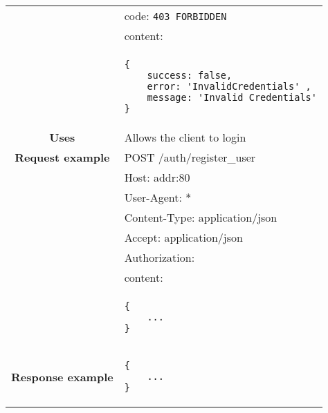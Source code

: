 \begin{adjustwidth}{1cm}{}
\begin{longtable}{|c|l|}
              & code: \texttt{403 FORBIDDEN} \\
            &                         content: \\
            & \begin{minipage}[t]{0.7\textwidth}
                \begin{adjustwidth}{1.5cm}{}
                \begin{verbatim}
{
    success: false, 
    error: 'InvalidCredentials' ,
    message: 'Invalid Credentials'
}
                \end{verbatim}
                \end{adjustwidth}
              \end{minipage} \\
              \hline
            \textbf{Uses} & Allows the client to login \\
            \hline
             \textbf{Request example}
             & POST /auth/register\_user \\
             & Host: addr:80\\
             & User-Agent: * \\
             & Content-Type: application/json\\
             & Accept: application/json\\
             & Authorization: \\
             & content: \\
            & \begin{minipage}[t]{0.5\textwidth}
                \begin{adjustwidth}{1.5cm}{}
                \begin{verbatim}
{
    ...
}
                \end{verbatim}
                \end{adjustwidth}
              \end{minipage} \\
              \hline
             \textbf{Response example} & 
              \begin{minipage}[t]{0.5\textwidth}
                \begin{adjustwidth}{1.5cm}{}
                \begin{verbatim}
{
    ...
}
                \end{verbatim}
                \end{adjustwidth}
              \end{minipage} \\
              \hline
        \end{longtable}
    \end{adjustwidth}
    
